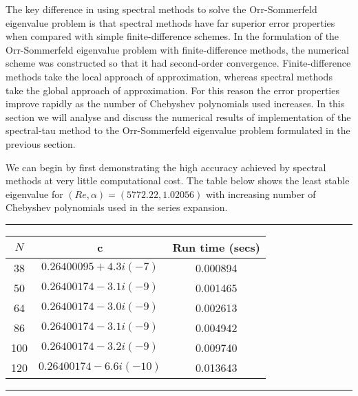 \documentclass[a4paper, 12pt, twoside, openright]{article}
\numberwithin{equation}{section}
\begin{document}
The key difference in using spectral methods to solve the Orr-Sommerfeld eigenvalue problem is that spectral methods have far superior error properties when compared with simple finite-difference schemes. In the formulation of the Orr-Sommerfeld eigenvalue problem with finite-difference methods, the numerical scheme was constructed so that it had second-order convergence. Finite-difference methods take the local approach of approximation, whereas spectral methods take the global approach of approximation. For this reason the error properties improve rapidly as the number of Chebyshev polynomials used increases. In this section we will analyse and discuss the numerical results of implementation of the spectral-tau method to the Orr-Sommerfeld eigenvalue problem formulated in the previous section. %

We can begin by first demonstrating the high accuracy achieved by spectral methods at very little computational cost. The table below shows the least stable eigenvalue for $(Re,\alpha)=(5772.22,1.02056)$ with increasing number of Chebyshev polynomials used in the series expansion.
\begin{table}[H]
\centering
\rule{\linewidth}{1.5pt}
\bgroup
\def\arraystretch{1.25}
\begin{tabular}{ c@{\qquad} c@{\qquad} c@{\qquad} }
$N$ & c \quad & Run time (secs)  \\\hline
38 & $0.26400095 + 4.3i(-7)$  & 0.000894 \\ %
50 &  $0.26400174 - 3.1i(-9)$ & 0.001465 \\ %
64  & $0.26400174 - 3.0i(-9)$  & 0.002613\\ %
86 & $0.26400174 - 3.1i(-9)$ & 0.004942\\ %
100 & $0.26400174 - 3.2i(-9)$ & 0.009740\\ %
120 & $0.26400174 - 6.6i(-10)$ & 0.013643\\ %
\end{tabular}
\rule{\linewidth}{1.5pt}
\egroup
\end{table}
\end{document}

